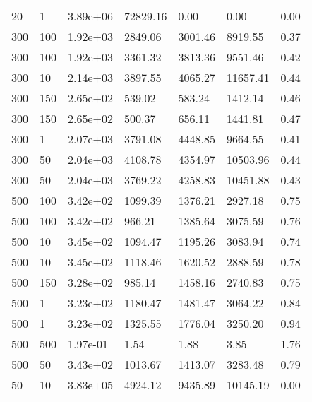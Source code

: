 \begin{table}
\begin{tabular}{lllllll}
20        &   1         &   3.89e+06  &   72829.16  &   0.00      &   0.00      &   0.00      \\ 
300       &   100       &   1.92e+03  &   2849.06   &   3001.46   &   8919.55   &   0.37      \\ 
300       &   100       &   1.92e+03  &   3361.32   &   3813.36   &   9551.46   &   0.42      \\ 
300       &   10        &   2.14e+03  &   3897.55   &   4065.27   &   11657.41  &   0.44      \\ 
300       &   150       &   2.65e+02  &   539.02    &   583.24    &   1412.14   &   0.46      \\ 
300       &   150       &   2.65e+02  &   500.37    &   656.11    &   1441.81   &   0.47      \\ 
300       &   1         &   2.07e+03  &   3791.08   &   4448.85   &   9664.55   &   0.41      \\ 
300       &   50        &   2.04e+03  &   4108.78   &   4354.97   &   10503.96  &   0.44      \\ 
300       &   50        &   2.04e+03  &   3769.22   &   4258.83   &   10451.88  &   0.43      \\ 
500       &   100       &   3.42e+02  &   1099.39   &   1376.21   &   2927.18   &   0.75      \\ 
500       &   100       &   3.42e+02  &   966.21    &   1385.64   &   3075.59   &   0.76      \\ 
500       &   10        &   3.45e+02  &   1094.47   &   1195.26   &   3083.94   &   0.74      \\ 
500       &   10        &   3.45e+02  &   1118.46   &   1620.52   &   2888.59   &   0.78      \\ 
500       &   150       &   3.28e+02  &   985.14    &   1458.16   &   2740.83   &   0.75      \\ 
500       &   1         &   3.23e+02  &   1180.47   &   1481.47   &   3064.22   &   0.84      \\ 
500       &   1         &   3.23e+02  &   1325.55   &   1776.04   &   3250.20   &   0.94      \\ 
500       &   500       &   1.97e-01  &   1.54      &   1.88      &   3.85      &   1.76      \\ 
500       &   50        &   3.43e+02  &   1013.67   &   1413.07   &   3283.48   &   0.79      \\ 
50        &   10        &   3.83e+05  &   4924.12   &   9435.89   &   10145.19  &   0.00      \\ 

\end{tabular}
\end{table}
